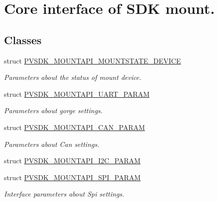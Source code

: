 \hypertarget{group___p_v_s_d_k___c_o_r_e___a_p_i___m_o_u_n_t_c_o_n_t_r_o_l}{}\section{Core interface of S\+DK mount.}
\label{group___p_v_s_d_k___c_o_r_e___a_p_i___m_o_u_n_t_c_o_n_t_r_o_l}
\subsection*{Classes}
\begin{DoxyCompactItemize}
\item 
struct \hyperlink{struct_p_v_s_d_k___m_o_u_n_t_a_p_i___m_o_u_n_t_s_t_a_t_e___d_e_v_i_c_e}{P\+V\+S\+D\+K\+\_\+\+M\+O\+U\+N\+T\+A\+P\+I\+\_\+\+M\+O\+U\+N\+T\+S\+T\+A\+T\+E\+\_\+\+D\+E\+V\+I\+CE}
\begin{DoxyCompactList}\small\item\em Parameters about the status of mount device. \end{DoxyCompactList}\item 
struct \hyperlink{struct_p_v_s_d_k___m_o_u_n_t_a_p_i___u_a_r_t___p_a_r_a_m}{P\+V\+S\+D\+K\+\_\+\+M\+O\+U\+N\+T\+A\+P\+I\+\_\+\+U\+A\+R\+T\+\_\+\+P\+A\+R\+AM}
\begin{DoxyCompactList}\small\item\em Parameters about gorge settings. \end{DoxyCompactList}\item 
struct \hyperlink{struct_p_v_s_d_k___m_o_u_n_t_a_p_i___c_a_n___p_a_r_a_m}{P\+V\+S\+D\+K\+\_\+\+M\+O\+U\+N\+T\+A\+P\+I\+\_\+\+C\+A\+N\+\_\+\+P\+A\+R\+AM}
\begin{DoxyCompactList}\small\item\em Parameters about Can settings. \end{DoxyCompactList}\item 
struct \hyperlink{struct_p_v_s_d_k___m_o_u_n_t_a_p_i___i2_c___p_a_r_a_m}{P\+V\+S\+D\+K\+\_\+\+M\+O\+U\+N\+T\+A\+P\+I\+\_\+\+I2\+C\+\_\+\+P\+A\+R\+AM}
\item 
struct \hyperlink{struct_p_v_s_d_k___m_o_u_n_t_a_p_i___s_p_i___p_a_r_a_m}{P\+V\+S\+D\+K\+\_\+\+M\+O\+U\+N\+T\+A\+P\+I\+\_\+\+S\+P\+I\+\_\+\+P\+A\+R\+AM}
\begin{DoxyCompactList}\small\item\em Interface parameters about Spi settings. \end{DoxyCompactList}\item 

\end{DoxyCompactItemize}
